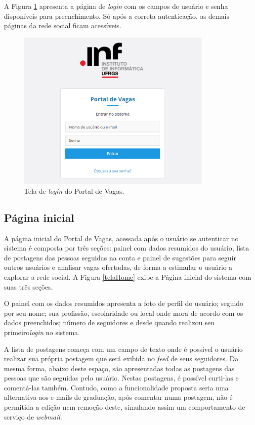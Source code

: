 \documentclass[cic,tc]{iiufrgs}
\begin{document}
A Figura \ref{telaLoginImg} apresenta a página de \textit{login} com os campos de usuário e senha disponíveis para preenchimento. Só após a correta autenticação, as demais páginas da rede social ficam acessíveis.

\begin{figure}[h]
    \caption{Tela de \textit{login} do Portal de Vagas.}
        \begin{center}
            \includegraphics[width=0.85\textwidth]{figuras/tela_login.png}
        \end{center}
    \label{telaLoginImg}
\end{figure}

\subsection{Página inicial}
\label{PDVFunFeed}

A página inicial do Portal de Vagas, acessada após o usuário se autenticar no sistema é composta por três seções: painel com dados resumidos do usuário, lista de postagens das pessoas seguidas na conta e painel de sugestões para seguir outros usuários e analisar vagas ofertadas, de forma a estimular o usuário a explorar a rede social. A Figura \ref{telaHome} exibe a Página inicial do sistema com suas três seções.

O painel com os dados resumidos apresenta a foto de perfil do usuário; seguido por seu nome; sua profissão, escolaridade ou local onde mora de acordo com os dados preenchidos; número de seguidores e desde quando realizou seu primeiro\textit{login} no sistema.

A lista de postagens começa com um campo de texto onde é possível o usuário realizar sua própria postagem que será exibida no \textit{feed} de seus seguidores. Da mesma forma, abaixo deste espaço, são apresentadas todas as postagens das pessoas que são seguidas pelo usuário. Nestas postagens, é possível curti-las e comentá-las também. Contudo, como a funcionalidade proposta seria uma alternativa aos e-mails de graduação, após comentar numa postagem, não é permitida a edição nem remoção deste, simulando assim um comportamento de serviço de \textit{webmail}.
\end{document}
